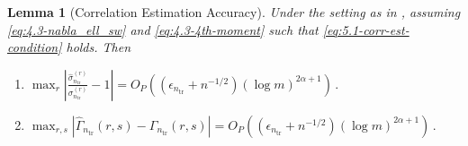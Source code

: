 \documentclass[11pt]{article}
\theoremstyle{plain}
\newtheorem{lemma}[theorem]{Lemma}
\newcommand{\tr}{{\mathrm{tr}}}
\begin{document}
\begin{lemma}
    [Correlation Estimation Accuracy]\label{lem:5.1-corr-est}
    Under the setting as in , assuming \eqref{eq:4.3-nabla_ell_sw} and \eqref{eq:4.3-4th-moment} such that \eqref{eq:5.1-corr-est-condition} holds.  Then 
    \begin{enumerate}
        \item $
    \max_{r}\left|\frac{\hat\sigma_{n_\tr}^{(r)}}{\sigma_{n_\tr}^{(r)}}-1\right|=O_P\left((\epsilon_{n_\tr}+n^{-1/2})(\log m)^{2\alpha+1}\right)\,.
    $
 \item  
    $
\max_{r,s}\left|\hat\Gamma_{n_\tr}(r,s) - \Gamma_{n_\tr}(r,s)\right|=O_P\left((\epsilon_{n_\tr}+n^{-1/2})(\log m)^{2\alpha+1}\right)\,.$
    \end{enumerate}
\end{lemma}
\end{document}
